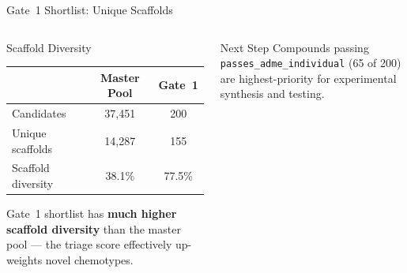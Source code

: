 \documentclass[aspectratio=169]{beamer}
\begin{document}
\begin{frame}{Gate~1 Shortlist: Unique Scaffolds}
  \begin{columns}
    \begin{block}{Scaffold Diversity}
      \small
      \begin{tabular}{lcc}
        \toprule
        & \textbf{Master Pool} & \textbf{Gate~1} \\
        \midrule
        Candidates  & 37,451 & 200 \\
        Unique scaffolds & 14,287 & 155 \\
        Scaffold diversity & 38.1\% & 77.5\% \\
        \bottomrule
      \end{tabular}
      \vspace{0.4em}

      Gate~1 shortlist has \textbf{much higher scaffold diversity} than the master pool --- the triage score effectively up-weights novel chemotypes.
    \end{block}
    \vspace{0.4em}
    \begin{alertblock}{Next Step}
      \small
      Compounds passing \texttt{passes\_adme\_individual} (65 of 200) are highest-priority for experimental synthesis and testing.
    \end{alertblock}


\end{columns}
\end{frame}
\end{document}
